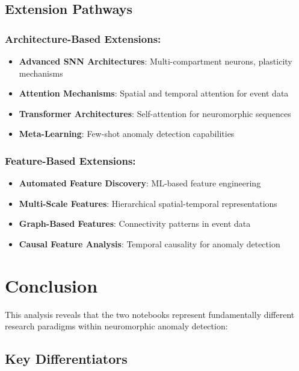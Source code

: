 \documentclass[11pt,a4paper]{article}
\begin{document}
\subsection{Extension Pathways}

\subsubsection{Architecture-Based Extensions:}
\begin{itemize}
    \item \textbf{Advanced SNN Architectures}: Multi-compartment neurons, plasticity mechanisms
    \item \textbf{Attention Mechanisms}: Spatial and temporal attention for event data
    \item \textbf{Transformer Architectures}: Self-attention for neuromorphic sequences
    \item \textbf{Meta-Learning}: Few-shot anomaly detection capabilities
\end{itemize}

\subsubsection{Feature-Based Extensions:}
\begin{itemize}
    \item \textbf{Automated Feature Discovery}: ML-based feature engineering
    \item \textbf{Multi-Scale Features}: Hierarchical spatial-temporal representations
    \item \textbf{Graph-Based Features}: Connectivity patterns in event data
    \item \textbf{Causal Feature Analysis}: Temporal causality for anomaly detection
\end{itemize}

\section{Conclusion}

This analysis reveals that the two notebooks represent fundamentally different research paradigms within neuromorphic anomaly detection:

\subsection{Key Differentiators}
\end{document}
